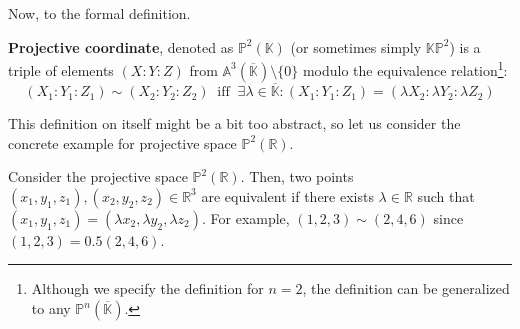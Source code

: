 \documentclass[../lecture-notes.tex]{subfiles}
\begin{document}
Now, to the formal definition.

\begin{definition}
    \textbf{Projective coordinate}, denoted as $\mathbb{P}^2(\mathbb{K})$ (or sometimes simply $\mathbb{K}\mathbb{P}^2$) is a triple of elements $(X:Y:Z)$ from $\mathbb{A}^3(\overline{\mathbb{K}}) \setminus \{0\}$ modulo the equivalence relation\footnote{Although we specify the definition for $n=2$, the definition can be generalized to any $\mathbb{P}^n(\overline{\mathbb{K}})$.}:
    \begin{equation}
        (X_1:Y_1:Z_1) \sim (X_2:Y_2:Z_2) \;\; \text{iff} \;\; \exists \lambda \in \overline{\mathbb{K}}: (X_1:Y_1:Z_1) = (\lambda X_2: \lambda Y_2: \lambda Z_2)
    \end{equation}
\end{definition}

This definition on itself might be a bit too abstract, so let us consider the concrete example for projective space $\mathbb{P}^2(\mathbb{R})$.

\begin{example}
    Consider the projective space $\mathbb{P}^2(\mathbb{R})$. Then, two points $(x_1,y_1,z_1),(x_2,y_2,z_2) \in \mathbb{R}^3$ are equivalent if there exists $\lambda \in \mathbb{R}$ such that $(x_1,y_1,z_1) = (\lambda x_2, \lambda y_2, \lambda z_2)$. For example, $(1,2,3) \sim (2,4,6)$ since $(1,2,3) = 0.5(2,4,6)$.
\end{example}
\end{document}
